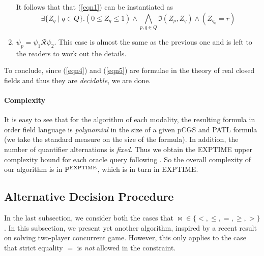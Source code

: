 \documentclass[times, 10 pt,twocolumn]{article}
\newtheorem{remark}{Remark}{\itshape}{\rm}
\newcommand{\mc}[1]{\mathcal{#1}}
\begin{document}
\begin{enumerate}
It follows that that (\ref{eqn1}) can be instantiated as %
%
\begin{equation}\label{eqn5}
\exists \{Z_q\mid q\in Q\}. (0\leq Z_q\leq 1)\wedge
\bigwedge_{p,q\in Q} \Im(Z_p, Z_q) \wedge (Z_{q_0} = r)
\end{equation}
%
\item $\psi_p=\psi_1\mc{R}\psi_2$. This case is almost the same as
the previous one and is left to the readers to work out the
details.
\end{enumerate}
To conclude, since (\ref{eqn4}) and (\ref{eqn5}) are formulae in
the theory of real closed fields and thus they are
\emph{decidable}, we are done.

%

\paragraph{Complexity} It is easy to see that for the
algorithm of each modality, the resulting formula in order field
language is \emph{polynomial} in the size of a given pCGS and PATL
formula (we take the standard measure on the size of the formula).
In addition, the number of quantifier alternations is
\emph{fixed}. Thus we obtain the E{\small XPTIME} upper complexity
bound for each oracle query following \cite{Tar51}\cite{Bas99}. So
the overall complexity of our algorithm is in ${\rm P}^{\rm
EXPTIME}$, which is in turn in E{\small XPTIME}.
%

\subsection{Alternative Decision Procedure} \label{approach2}
In the last subsection, we consider both the cases that
$\bowtie\in \{<, \leq, =, \geq, >\}$. In this subsection, we
present yet another algorithm, inspired by a recent result on
solving two-player concurrent game. However, this only applies to
the case that strict equality $=$ is \emph{not} allowed in the
constraint.
\end{document}
